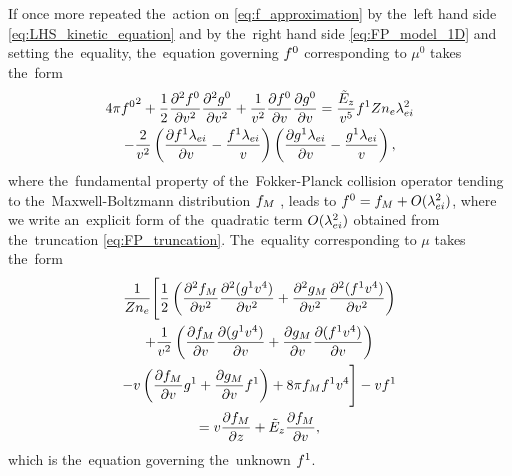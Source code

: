 If once more repeated the~action on \eqref{eq:f_approximation} by the~left 
hand side \eqref{eq:LHS_kinetic_equation} and by the~right hand side 
\eqref{eq:FP_model_1D} and setting the~equality, the~equation governing
$f^0$ corresponding to $\mu^0$ takes the~form
\begin{multline}
  4\pi{f^0}^2 + 
  \frac{1}{2}\frac{\partial^2 f^0}{\partial v^2}
  \frac{\partial^2 g^0}{\partial v^2}
  + \frac{1}{v^2}\frac{\partial{f^0}}{\partial{v}}\frac{\partial{g^0}}{\partial{v}} = 
  \frac{\tilde{E}_z}{v^5}f^1 Z n_e\lambda_{ei}^2 \\
  - \frac{2}{v^2}
  \left(\frac{\partial{f^1\lambda_{ei}}}{\partial{v}} - \frac{f^1\lambda_{ei}}{v} \right)
  \left(\frac{\partial{g^1\lambda_{ei}}}{\partial{v}} - \frac{g^1\lambda_{ei}}{v} \right),
  \label{eq:FP_f0} 
\end{multline}
where the~fundamental property of the~Fokker-Planck collision operator
tending to the~Maxwell-Boltzmann distribution $f_M$ \cite{Longmire_1963}, leads
to $f^0 = f_M + O(\lambda_{ei}^2)$, where we write an~explicit form of 
the~quadratic term $O(\lambda_{ei}^2)$ obtained from the~truncation 
\eqref{eq:FP_truncation}.
The~equality corresponding to $\mu$ takes the~form
\begin{multline}
  \frac{1}{Z n_e}\Bigg[
  \frac{1}{2}\left(\frac{\partial^2 f_M}{\partial v^2}
  \frac{\partial^2 (g^1v^4)}{\partial v^2}
  + \frac{\partial^2 g_M}{\partial v^2} 
  \frac{\partial^2 (f^1v^4)}{\partial v^2}
  \right) \\ 
  + \frac{1}{v^2}\left(\frac{\partial{f_M}}{\partial{v}} \frac{\partial{(g^1v^4)}}{\partial{v}} 
  + \frac{\partial{g_M}}{\partial{v}}\frac{\partial{(f^1v^4)}}{\partial{v}}\right) \\
  - v\left(\frac{\partial{f_M}}{\partial{v}}g^1 
  + \frac{\partial{g_M}}{\partial{v}}f^1\right)
  + 8\pi f_M f^1v^4 \Bigg]
  - v f^1
  \\ =  
  v\frac{\partial{f_M}}{\partial{z}} + \tilde{E}_z\frac{\partial{f_M}}{\partial{v}} ,
  \label{eq:FP_f1_ODE}
\end{multline}
which is the~equation governing the~unknown $f^1$.


